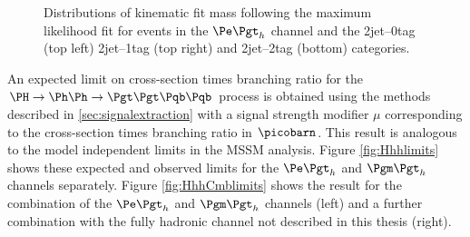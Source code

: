 \begin{figure}
\begin{center}

\end{center}
\caption{
Distributions of kinematic fit mass following the maximum likelihood fit for
events in the $\etau$ channel and the 2jet--0tag (top left) 2jet--1tag (top
right) and 2jet--2tag (bottom) categories.}
\label{fig:PostFitMHetau}
\end{figure} 

An expected limit on cross-section times branching ratio for the $\Hhh$
process is obtained using the methods described in \ref{sec:signalextraction}
with a signal strength modifier $\mu$ corresponding to the cross-section times
branching ratio in $\picobarn$. This result is analogous to the model independent
limits in the \ac{MSSM} analysis. Figure \ref{fig:Hhhlimits} shows these
expected and observed limits for the $\etau$ and $\mutau$ channels separately.
Figure \ref{fig:HhhCmblimits} shows the result for the combination of the
$\etau$ and $\mutau$ channels (left) and a further combination with the fully
hadronic channel not described in this thesis (right).


